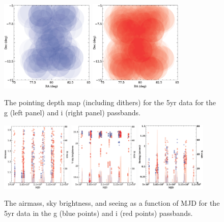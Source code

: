\documentclass[prd, nofootinbib, floatfix, 11pt,tightenlines,times]{article}
\begin{document}
\begin{figure}
\centerline{
\includegraphics[width=0.4\textwidth]{Figures/depth_g.eps}\hfil
\includegraphics[width=0.4\textwidth]{Figures/depth_i.eps}
}
\caption{The pointing depth map (including dithers) for the 5yr data for the g (left panel)
 and i (right panel)  passbands.}
\label{depth}
\end{figure}


\begin{figure}
\centerline{
\includegraphics[width=0.3\textwidth]{Figures/airmass_mjd.eps}\hfil
\includegraphics[width=0.3\textwidth]{Figures/sky_mjd.eps}\hfil
\includegraphics[width=0.3\textwidth]{Figures/seeing.eps}
}
\caption{The airmass, sky brightness, and seeing as a function of MJD for the
  5yr data in the g (blue points) and i (red points) passbands.}
\label{airmass}
\end{figure}
\end{document}

